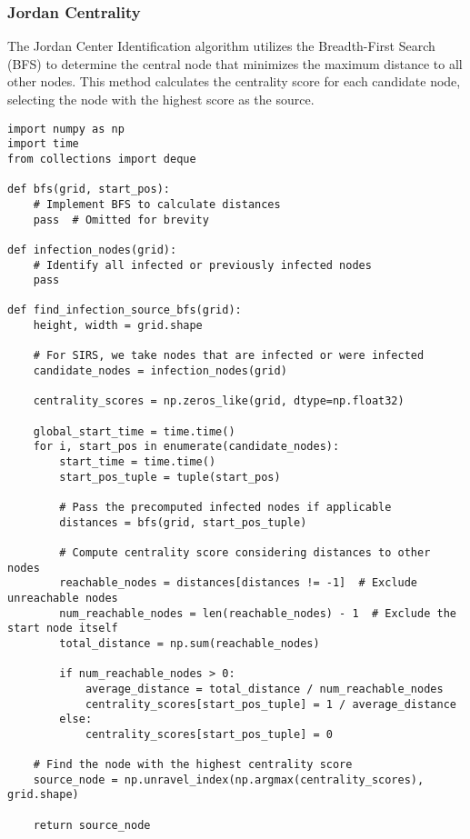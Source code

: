 \subsubsection{Jordan Centrality}
The Jordan Center Identification algorithm utilizes the Breadth-First Search (BFS) to determine the central node that minimizes the maximum distance to all other nodes. This method calculates the centrality score for each candidate node, selecting the node with the highest score as the source.

\begin{lstlisting}[caption=Jordan Centrality using BFS, label=lst:jordan-center]
import numpy as np
import time
from collections import deque

def bfs(grid, start_pos):
    # Implement BFS to calculate distances
    pass  # Omitted for brevity

def infection_nodes(grid):
    # Identify all infected or previously infected nodes
    pass

def find_infection_source_bfs(grid):
    height, width = grid.shape

    # For SIRS, we take nodes that are infected or were infected
    candidate_nodes = infection_nodes(grid)

    centrality_scores = np.zeros_like(grid, dtype=np.float32)

    global_start_time = time.time()
    for i, start_pos in enumerate(candidate_nodes):
        start_time = time.time()
        start_pos_tuple = tuple(start_pos)
        
        # Pass the precomputed infected nodes if applicable
        distances = bfs(grid, start_pos_tuple)

        # Compute centrality score considering distances to other nodes
        reachable_nodes = distances[distances != -1]  # Exclude unreachable nodes
        num_reachable_nodes = len(reachable_nodes) - 1  # Exclude the start node itself
        total_distance = np.sum(reachable_nodes)
        
        if num_reachable_nodes > 0:
            average_distance = total_distance / num_reachable_nodes
            centrality_scores[start_pos_tuple] = 1 / average_distance
        else:
            centrality_scores[start_pos_tuple] = 0

    # Find the node with the highest centrality score
    source_node = np.unravel_index(np.argmax(centrality_scores), grid.shape)
    
    return source_node
\end{lstlisting}

